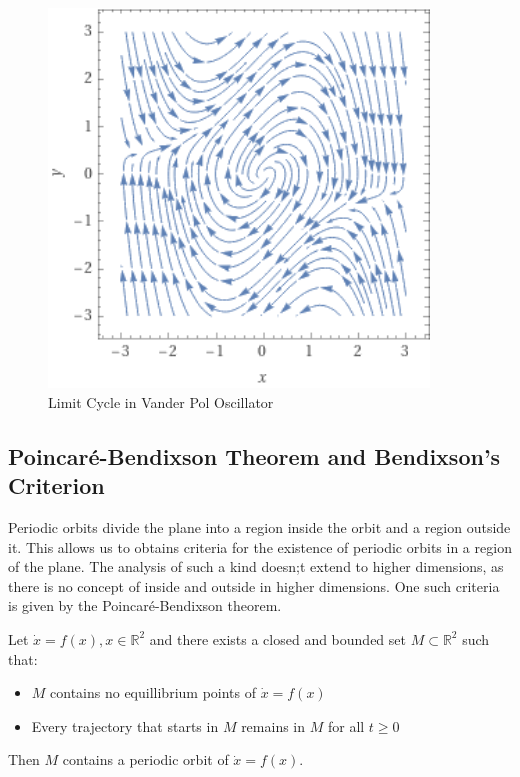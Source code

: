 \begin{minipage}
    {0.5\textwidth}
    \begin{figure}[H]
        \centering
        \includegraphics[width=0.9\textwidth]{figures/phaseportraits/van.png}
        \caption{Limit Cycle in Vander Pol Oscillator}
        \label{fig:van-der-pol-oscillator}
    \end{figure}
\end{minipage}

\subsection{Poincar\'e-Bendixson Theorem and Bendixson's Criterion}
Periodic orbits divide the plane into a region inside the orbit and a region outside it.
This allows us to obtains criteria for the existence of periodic orbits in a region of the plane.
The analysis of such a kind doesn;t extend to higher dimensions, as there is no concept of
inside and outside in higher dimensions. One such criteria is given by the Poincar\'e-Bendixson
theorem.

\begin{theorem}
Let \(\dot{x} = f(x) , x \in \mathbb{R}^2\) and there exists a closed and bounded set
\(M \subset \mathbb{R}^2\) such that:
\begin{itemize}
    \item \(M\) contains no equillibrium points of \(\dot{x} = f(x)\)
    \item Every trajectory that starts in \(M\) remains in \(M\) for all \(t \geq 0\) 
\end{itemize} 
Then \(M\) contains a periodic orbit of \(\dot{x} = f(x)\).
\end{theorem}

